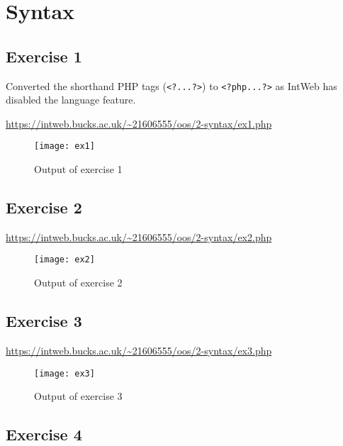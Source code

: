 \chapter{Syntax}
\graphicspath{{2-syntax/images/}}

\section{Exercise 1}

Converted the shorthand PHP tags (\texttt{<?...?>}) to \texttt{<?php...?>} as IntWeb has disabled the language feature.

\url{https://intweb.bucks.ac.uk/~21606555/oos/2-syntax/ex1.php}
\captionsetup{type=figure}


\begin{figure}[H]
  \caption{Output of exercise 1}
  \centering
  \texttt{[image: ex1]}
\end{figure}

\clearpage
\section{Exercise 2}

\url{https://intweb.bucks.ac.uk/~21606555/oos/2-syntax/ex2.php}
\captionsetup{type=figure}


\begin{figure}[H]
  \caption{Output of exercise 2}
  \centering
  \texttt{[image: ex2]}
\end{figure}

\clearpage
\section{Exercise 3}

\url{https://intweb.bucks.ac.uk/~21606555/oos/2-syntax/ex3.php}
\captionsetup{type=figure}


\begin{figure}[H]
  \caption{Output of exercise 3}
  \centering
  \texttt{[image: ex3]}
\end{figure}

\clearpage
\section{Exercise 4}

